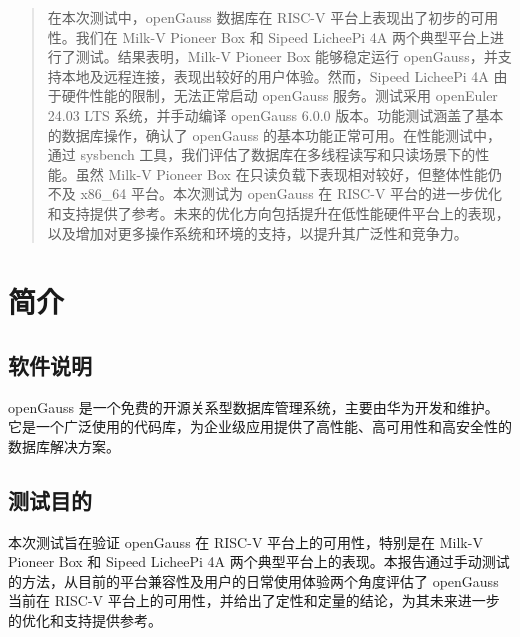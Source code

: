 \documentclass{article}
\begin{document}
\maketitle

\begin{abstract}
在本次测试中，openGauss 数据库在 RISC-V 平台上表现出了初步的可用性。我们在 Milk-V Pioneer Box 和 Sipeed LicheePi 4A 两个典型平台上进行了测试。结果表明，Milk-V Pioneer Box 能够稳定运行 openGauss，并支持本地及远程连接，表现出较好的用户体验。然而，Sipeed LicheePi 4A 由于硬件性能的限制，无法正常启动 openGauss 服务。测试采用 openEuler 24.03 LTS 系统，并手动编译 openGauss 6.0.0 版本。功能测试涵盖了基本的数据库操作，确认了 openGauss 的基本功能正常可用。在性能测试中，通过 sysbench 工具，我们评估了数据库在多线程读写和只读场景下的性能。虽然 Milk-V Pioneer Box 在只读负载下表现相对较好，但整体性能仍不及 x86\_64 平台。本次测试为 openGauss 在 RISC-V 平台的进一步优化和支持提供了参考。未来的优化方向包括提升在低性能硬件平台上的表现，以及增加对更多操作系统和环境的支持，以提升其广泛性和竞争力。
\end{abstract}

\thispagestyle{empty} %

\newpage
\tableofcontents

\newpage

\section{简介}

\subsection{软件说明}
openGauss 是一个免费的开源关系型数据库管理系统，主要由华为开发和维护。它是一个广泛使用的代码库，为企业级应用提供了高性能、高可用性和高安全性的数据库解决方案。

\subsection{测试目的}
本次测试旨在验证 openGauss 在 RISC-V 平台上的可用性，特别是在 Milk-V Pioneer Box 和 Sipeed LicheePi 4A 两个典型平台上的表现。本报告通过手动测试的方法，从目前的平台兼容性及用户的日常使用体验两个角度评估了 openGauss 当前在 RISC-V 平台上的可用性，并给出了定性和定量的结论，为其未来进一步的优化和支持提供参考。
\end{document}
